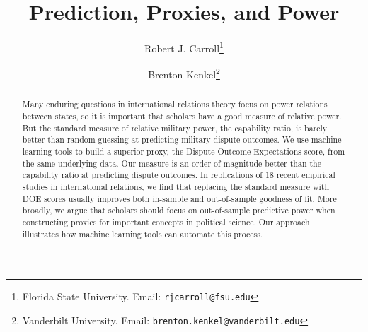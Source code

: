 \documentclass[12pt,oneside]{article}
\title{
  Prediction, Proxies, and Power%
}
\author{
	Robert J. Carroll\thanks{Florida State University.  Email:  \nolinkurl{rjcarroll@fsu.edu}} \and Brenton Kenkel\thanks{Vanderbilt University.  Email:  \nolinkurl{brenton.kenkel@vanderbilt.edu}}
}
\begin{document}
\maketitle

\begin{abstract}
  \noindent
  Many enduring questions in international relations theory focus on power relations between states, so it is important that scholars have a good measure of relative power.
  But the standard measure of relative military power, the capability ratio, is barely better than random guessing at predicting military dispute outcomes.
  We use machine learning tools to build a superior proxy, the Dispute Outcome Expectations score, from the same underlying data.
  Our measure is an order of magnitude better than the capability ratio at predicting dispute outcomes.
  In replications of 18 recent empirical studies in international relations, we find that replacing the standard measure with DOE scores usually improves both in-sample and out-of-sample goodness of fit.
  More broadly, we argue that scholars should focus on out-of-sample predictive power when constructing proxies for important concepts in political science.
  Our approach illustrates how machine learning tools can automate this process.
\end{abstract}

\thispagestyle{empty}
\newpage
\setcounter{page}{1}



















\newpage




\clearpage
\appendix

\end{document}
